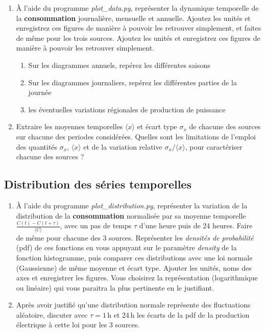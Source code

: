 \documentclass[12pt,a4]{article}
\newcommand{\tmtextbf}[1]{{\bfseries{#1}}}
\newcommand{\tmtextit}[1]{{\itshape{#1}}}
\begin{document}
\begin{enumerate}
  \item À l'aide du programme \tmtextit{plot\_data.py}, représenter la
  dynamique temporelle de la \tmtextbf{consommation} journalière, mensuelle
  et annuelle. Ajoutez les unités et enregistrez ces figures de manière à
  pouvoir les retrouver simplement, et faites de même pour les trois sources.
  Ajoutez les unités et enregistrez ces figures de manière à pouvoir les
  retrouver simplement.
  \begin{enumerate}
    \item Sur les diagrammes annuels, repérez les différentes saisons
    
    \item Sur les diagrammes journaliers, repérez les différentes parties de
    la journée
    
    \item les éventuelles variations régionales de production de puissance
  \end{enumerate}
  \item Extraire les moyennes temporelles $\langle x \rangle$ et écart type
  $\sigma_x$ de chacune des sources sur chacune des periodes considérées.
  Quelles sont les limitations de l'emploi des quantités $\sigma_x $, $ \langle
  x \rangle$ et de la variation relative $\sigma_x / \langle
  x \rangle$, pour caractériser chacune des sources ?
\end{enumerate}

\subsection{Distribution des séries temporelles}

\begin{enumerate}
  \item À l'aide du programme \tmtextit{plot\_distribution.py}, représenter
  la variation de la distribution de la \tmtextbf{consommation} normalisée
  par sa moyenne temporelle $\frac{C (t) - C (t + \tau)}{\langle C \rangle}$,
  avec un pas de temps $\tau$ d'une heure puis de 24 heures. Faire de même
  pour chacune des 3 sources. Représenter les \tmtextit{densités de probabilité}
  (pdf) de ces fonctions en vous appuyant sur le paramètre \tmtextit{density}
  de la fonction histogramme, puis comparer ces distributions avec une loi
  normale (Gaussienne) de même moyenne et écart type. Ajouter les unités,
  noms des axes et enregistrer les figures. Vous choisirez la représentation
  (logarithmique ou linéaire) qui vous paraitra la plus pertinente en le justifiant.
  
  \item Après avoir justifié qu'une distribution normale représente des
  fluctuations aléatoire, discuter avec $\tau = 1$\,h et 24\,h les écarts de la
  pdf de la production électrique à cette loi pour les 3 sources.
\end{enumerate}
\end{document}
